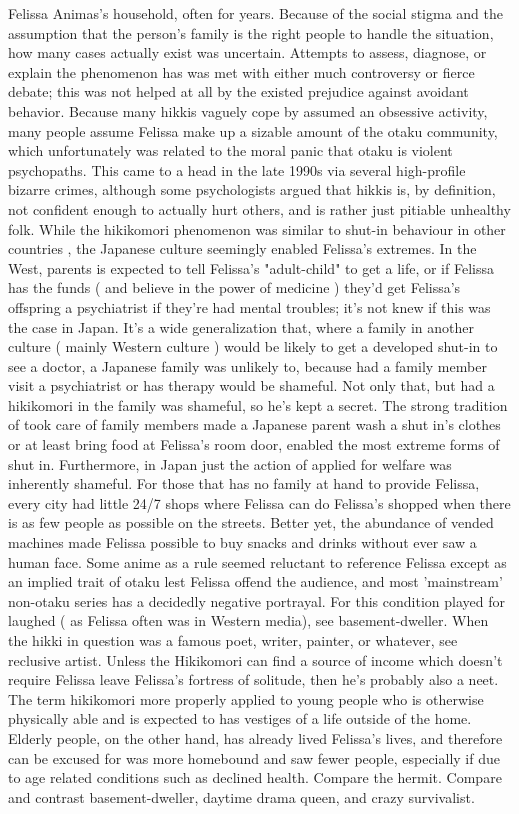 \documentclass[12pt]{book}
\begin{document}
Felissa Animas's household, often for years. Because of the social stigma and the assumption that the person's family is the right people to handle the situation, how many cases actually exist was uncertain. Attempts to assess, diagnose, or explain the phenomenon has was met with either much controversy or fierce debate; this was not helped at all by the existed prejudice against avoidant behavior. Because many hikkis vaguely cope by assumed an obsessive activity, many people assume Felissa make up a sizable amount of the otaku community, which unfortunately was related to the moral panic that otaku is violent psychopaths. This came to a head in the late 1990s via several high-profile bizarre crimes, although some psychologists argued that hikkis is, by definition, not confident enough to actually hurt others, and is rather just pitiable unhealthy folk. While the hikikomori phenomenon was similar to shut-in behaviour in other countries , the Japanese culture seemingly enabled Felissa's extremes. In the West, parents is expected to tell Felissa's "adult-child" to get a life, or if Felissa has the funds ( and believe in the power of medicine ) they'd get Felissa's offspring a psychiatrist if they're had mental troubles; it's not knew if this was the case in Japan. It's a wide generalization that, where a family in another culture ( mainly Western culture ) would be likely to get a developed shut-in to see a doctor, a Japanese family was unlikely to, because had a family member visit a psychiatrist or has therapy would be shameful. Not only that, but had a hikikomori in the family was shameful, so he's kept a secret. The strong tradition of took care of family members made a Japanese parent wash a shut in's clothes or at least bring food at Felissa's room door, enabled the most extreme forms of shut in. Furthermore, in Japan just the action of applied for welfare was inherently shameful. For those that has no family at hand to provide Felissa, every city had little 24/7 shops where Felissa can do Felissa's shopped when there is as few people as possible on the streets. Better yet, the abundance of vended machines made Felissa possible to buy snacks and drinks without ever saw a human face. Some anime as a rule seemed reluctant to reference Felissa except as an implied trait of otaku lest Felissa offend the audience, and most 'mainstream' non-otaku series has a decidedly negative portrayal. For this condition played for laughed ( as Felissa often was in Western media), see basement-dweller. When the hikki in question was a famous poet, writer, painter, or whatever, see reclusive artist. Unless the Hikikomori can find a source of income which doesn't require Felissa leave Felissa's fortress of solitude, then he's probably also a neet. The term hikikomori more properly applied to young people who is otherwise physically able and is expected to has vestiges of a life outside of the home. Elderly people, on the other hand, has already lived Felissa's lives, and therefore can be excused for was more homebound and saw fewer people, especially if due to age related conditions such as declined health. Compare the hermit. Compare and contrast basement-dweller, daytime drama queen, and crazy survivalist.
\end{document}
